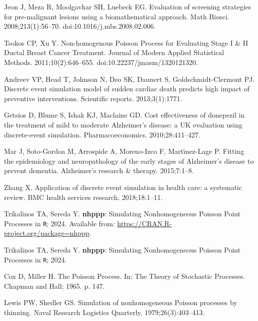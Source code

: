\documentclass[10pt,letterpaper]{article}
\newcommand{\pkg}[1]{{\bf #1}}
\newcommand{\proglang}[1]{\texttt{#1}}
\begin{document}
\begin{thebibliography}{10}
Jeon J, Meza R, Moolgavkar SH, Luebeck EG.
\newblock Evaluation of screening strategies for pre-malignant lesions using a biomathematical approach.
\newblock Math Biosci. 2008;213(1):56--70.
\newblock doi:{10.1016/j.mbs.2008.02.006}.

Tsokos CP, Xu Y.
\newblock Non-homogenous Poisson Process for Evaluating Stage I \& II Ductal Breast Cancer Treatment.
\newblock Journal of Modern Applied Statistical Methods. 2011;10(2):646--655.
\newblock doi:{10.22237/jmasm/1320121320}.

Andreev VP, Head T, Johnson N, Deo SK, Daunert S, Goldschmidt-Clermont PJ.
\newblock Discrete event simulation model of sudden cardiac death predicts high impact of preventive interventions.
\newblock Scientific reports. 2013;3(1):1771.

Getsios D, Blume S, Ishak KJ, Maclaine GD.
\newblock Cost effectiveness of donepezil in the treatment of mild to moderate Alzheimer’s disease: a UK evaluation using discrete-event simulation.
\newblock Pharmacoeconomics. 2010;28:411--427.

Mar J, Soto-Gordoa M, Arrospide A, Moreno-Izco F, Mart{\'\i}nez-Lage P.
\newblock Fitting the epidemiology and neuropathology of the early stages of Alzheimer’s disease to prevent dementia.
\newblock Alzheimer's research \& therapy. 2015;7:1--8.

Zhang X.
\newblock Application of discrete event simulation in health care: a systematic review.
\newblock BMC health services research. 2018;18:1--11.

Trikalinos TA, Sereda Y. \pkg{nhppp}: Simulating Nonhomogeneous Poisson Point Processes in \proglang{R}; 2024.
\newblock Available from: \url{https://CRAN.R-project.org/package=nhppp}.

Trikalinos TA, Sereda Y. \pkg{nhppp}: Simulating Nonhomogeneous Poisson Point Processes in \proglang{R}; 2024.

Cox D, Miller H.
\newblock The {P}oisson Process.
\newblock In: The Theory of Stochastic Processes. Chapman and Hall; 1965. p. 147.

Lewis PW, Shedler GS.
\newblock Simulation of nonhomogeneous {P}oisson processes by thinning.
\newblock Naval Research Logistics Quarterly. 1979;26(3):403--413.


\end{thebibliography}
\end{document}
